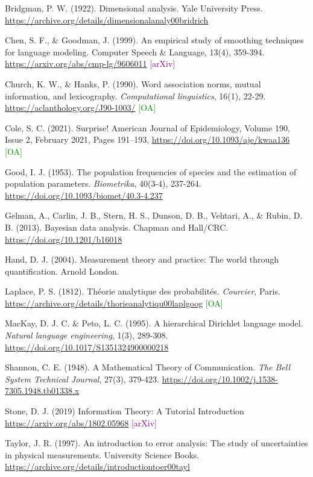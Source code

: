 \documentclass[12pt,a4paper]{article}
\newcommand{\openaccess}{{\small\textcolor{green}{[OA]}}}
\newcommand{\arxiv}{{\small\textcolor{purple}{[arXiv]}}}
\begin{document}

\begin{thebibliography}{9}

 Bridgman, P. W. (1922).
    Dimensional analysis.
    Yale University Press.
    \url{https://archive.org/details/dimensionalanaly00bridrich}

 Chen, S. F., \& Goodman, J. (1999).
    An empirical study of smoothing techniques for language modeling.
    Computer Speech \& Language, 13(4), 359-394.
    \url{https://arxiv.org/abs/cmp-lg/9606011}
    \arxiv

 Church, K. W., \& Hanks, P. (1990). 
    Word association norms, mutual information, and lexicography.
    \textit{Computational linguistics}, 16(1), 22-29.
    \url{https://aclanthology.org/J90-1003/}
    \openaccess
    
 Cole, S. C. (2021).
    Surprise!
    American Journal of Epidemiology, Volume 190, Issue 2, February 2021, Pages 191–193,
    \url{https://doi.org/10.1093/aje/kwaa136}
    \openaccess

 Good, I. J. (1953).
    The population frequencies of species and the estimation of population parameters.
    \textit{Biometrika}, 40(3-4), 237-264.
    \url{https://doi.org/10.1093/biomet/40.3-4.237}

 Gelman, A., Carlin, J. B., Stern, H. S., 
    Dunson, D. B., Vehtari, A., \& Rubin, D. B. (2013).
    Bayesian data analysis.
    Chapman and Hall/CRC.
    \url{https://doi.org/10.1201/b16018}

 Hand, D. J. (2004).
    Measurement theory and practice: The world through quantification.
    Arnold London.

 Laplace, P. S. (1812).
    Théorie analytique des probabilités.
    \textit{Courcier}, Paris.
    \url{https://archive.org/details/thorieanalytiqu00laplgoog}
    \openaccess

 MacKay, D. J. C. \& Peto, L. C. (1995).
    A hierarchical Dirichlet language model.
    \textit{Natural language engineering}, 1(3), 289-308.
    \url{https://doi.org/10.1017/S1351324900000218}

 Shannon, C. E. (1948).
    A Mathematical Theory of Communication.
    \textit{The Bell System Technical Journal}, 27(3), 379-423.
    \url{https://doi.org/10.1002/j.1538-7305.1948.tb01338.x}

 Stone, D. J. (2019)
    Information Theory: A Tutorial Introduction
    \url{https://arxiv.org/abs/1802.05968}
    \arxiv

 Taylor, J. R. (1997).
    An introduction to error analysis: The study of uncertainties in physical measurements.
    University Science Books.
    \url{https://archive.org/details/introductiontoer00tayl}
    
\end{thebibliography}
\end{document}
